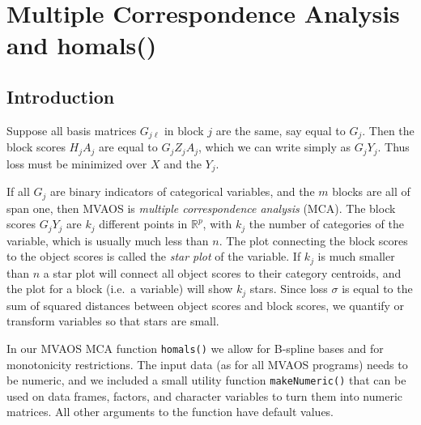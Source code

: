 \documentclass[
  12pt,
  letterpaper,
]{scrbook}
\begin{document}

\chapter{Multiple Correspondence Analysis and
homals()}\label{multiple-correspondence-analysis-and-homals}

\section{Introduction}\label{introduction-1}

Suppose all basis matrices \(G_{j\ell}\) in block \(j\) are the same,
say equal to \(G_j\). Then the block scores \(H_jA_j\) are equal to
\(G_jZ_jA_j\), which we can write simply as \(G_jY_j\). Thus loss must
be minimized over \(X\) and the \(Y_j\).

If all \(G_j\) are binary indicators of categorical variables, and the
\(m\) blocks are all of span one, then MVAOS is \emph{multiple
correspondence analysis} (MCA). The block scores \(G_jY_j\) are \(k_j\)
different points in \(\mathbb{R}^p\), with \(k_j\) the number of
categories of the variable, which is usually much less than \(n\). The
plot connecting the block scores to the object scores is called the
\emph{star plot} of the variable. If \(k_j\) is much smaller than \(n\)
a star plot will connect all object scores to their category centroids,
and the plot for a block (i.e.~a variable) will show \(k_j\) stars.
Since loss \(\sigma\) is equal to the sum of squared distances between
object scores and block scores, we quantify or transform variables so
that stars are small.

In our MVAOS MCA function \texttt{homals()} we allow for B-spline bases
and for monotonicity restrictions. The input data (as for all MVAOS
programs) needs to be numeric, and we included a small utility function
\texttt{makeNumeric()} that can be used on data frames, factors, and
character variables to turn them into numeric matrices. All other
arguments to the function have default values.
\end{document}
